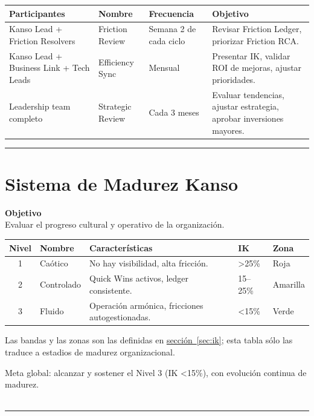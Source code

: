 \begin{center}
\small
\begin{tabular}{||p{2.5cm}|p{2.5cm}|p{2cm}|p{5.5cm}||}
\hline
\textbf{Participantes} & \textbf{Nombre} & \textbf{Frecuencia} & \textbf{Objetivo} \\ \hline
Kanso Lead + Friction Resolvers & Friction Review & Semana 2 de cada ciclo & Revisar Friction Ledger, priorizar Friction RCA. \\ \hline
Kanso Lead + Business Link + Tech Leads & Efficiency Sync & Mensual & Presentar IK, validar ROI de mejoras, ajustar prioridades. \\ \hline
Leadership team completo & Strategic Review & Cada 3 meses & Evaluar tendencias, ajustar estrategia, aprobar inversiones mayores. \\ \hline
\end{tabular}
\end{center}



\hrule
\section{Sistema de Madurez Kanso}

\textbf{Objetivo}\\
Evaluar el progreso cultural y operativo de la organización.

\begin{center}
\begin{tabular}{|c|p{2.5cm}|p{5.5cm}|p{1.8cm}|p{1.8cm}|}
\hline
Nivel & Nombre & Características & IK & Zona \\ \hline
1 & Caótico & No hay visibilidad, alta fricción. & >25\% & Roja \\ \hline
2 & Controlado & Quick Wins activos, ledger consistente. & 15--25\% & Amarilla \\ \hline
3 & Fluido & Operación armónica, fricciones autogestionadas. & <15\% & Verde \\ \hline
\end{tabular}
\end{center}

Las bandas y las zonas son las definidas en \hyperref[sec:ik]{sección~\ref{sec:ik}}; esta tabla
sólo las traduce a estadios de madurez organizacional.

Meta global: alcanzar y sostener el Nivel 3 (IK <15\%), con evolución continua de madurez.
\\
\\
\hrule

